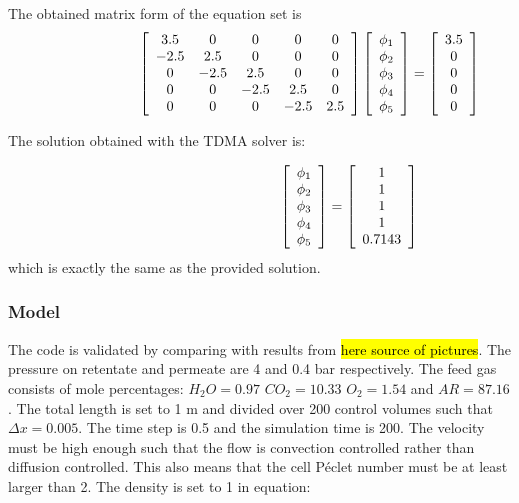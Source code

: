 The obtained matrix form of the equation set is
\[\hspace{2.5cm}
\left[\begin{array}{ccccc} 
3.5		& 0 	& 0  	& 0 	& 0   \\
-2.5	& 2.5	& 0		& 0		& 0   \\
0		& -2.5	& 2.5	& 0		& 0   \\
0		& 0		&-2.5	& 2.5	& 0   \\
0		& 0 	& 0		&-2.5	& 2.5 \\
\end{array}\right] 
\left[\begin{array}{c}  	
 \phi_1   \\
 \phi_2   \\
 \phi_3   \\
 \phi_4   \\
 \phi_5   \\
\end{array}\right] = 
\left[\begin{array}{c}  	
3.5   \\
0     \\
0     \\
0     \\
0     \\
\end{array}\right]\]

The solution obtained with the TDMA solver is:

\[\hspace{4.5cm} 
\left[\begin{array}{c}  	
\phi_1   \\
\phi_2   \\
\phi_3   \\
\phi_4   \\
\phi_5   \\
\end{array}\right] = 
\left[\begin{array}{c}  	
1      \\
1      \\
1      \\
1      \\
0.7143 \\
\end{array}\right]\]
which is exactly the same as the provided solution. 
\subsubsection{Model}
The code is validated by comparing with results from \hl{here source of pictures}.
The pressure on retentate and permeate are 4 and 0.4 bar respectively. The feed gas consists of mole percentages: \newline 
$H_2O=0.97$ $CO_2= 10.33$ $O_2 =1.54$ and $AR = 87.16  $. The total length is set to 1 m and divided over 200 control volumes such that $\Delta x = 0.005$. The time step is 0.5 and the simulation time is 200. The velocity must be high enough such that the flow is convection controlled rather than diffusion controlled. This also means that the cell P\'eclet number must be at least larger than 2. The density is set to 1 in equation:

